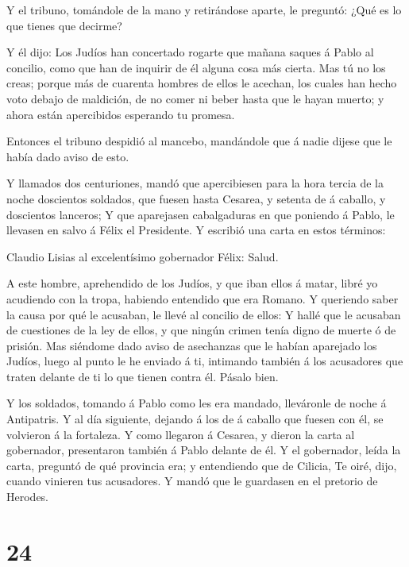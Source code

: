  Y el tribuno, tomándole de la mano y retirándose aparte,
le preguntó: ¿Qué es lo que tienes que decirme?

 Y él dijo: Los Judíos han concertado rogarte que mañana
saques á Pablo al concilio, como que han de inquirir de él alguna cosa
más cierta.  Mas tú no los creas; porque más de cuarenta
hombres de ellos le acechan, los cuales han hecho voto debajo de
maldición, de no comer ni beber hasta que le hayan muerto; y ahora están
apercibidos esperando tu promesa.

 Entonces el tribuno despidió al mancebo, mandándole que á
nadie dijese que le había dado aviso de esto.

 Y llamados dos centuriones, mandó que apercibiesen para la
hora tercia de la noche doscientos soldados, que fuesen hasta Cesarea, y
setenta de á caballo, y doscientos lanceros;  Y que
aparejasen cabalgaduras en que poniendo á Pablo, le llevasen en salvo á
Félix el Presidente.  Y escribió una carta en estos
términos:

 Claudio Lisias al excelentísimo gobernador Félix: Salud.

 A este hombre, aprehendido de los Judíos, y que iban ellos
á matar, libré yo acudiendo con la tropa, habiendo entendido que era
Romano.  Y queriendo saber la causa por qué le acusaban, le
llevé al concilio de ellos:  Y hallé que le acusaban de
cuestiones de la ley de ellos, y que ningún crimen tenía digno de muerte
ó de prisión.  Mas siéndome dado aviso de asechanzas que le
habían aparejado los Judíos, luego al punto le he enviado á ti,
intimando también á los acusadores que traten delante de ti lo que
tienen contra él. Pásalo bien.

 Y los soldados, tomando á Pablo como les era mandado,
lleváronle de noche á Antipatris.  Y al día siguiente,
dejando á los de á caballo que fuesen con él, se volvieron á la
fortaleza.  Y como llegaron á Cesarea, y dieron la carta al
gobernador, presentaron también á Pablo delante de él.  Y
el gobernador, leída la carta, preguntó de qué provincia era; y
entendiendo que de Cilicia,  Te oiré, dijo, cuando vinieren
tus acusadores. Y mandó que le guardasen en el pretorio de Herodes.

\hypertarget{section-23}{%
\section{24}\label{section-23}}

